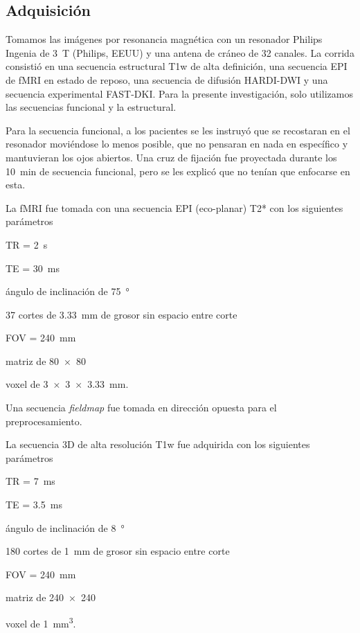 \subsection{Adquisición}
Tomamos las imágenes por resonancia magnética con un resonador Philips Ingenia de \SI{3}{\tesla} (Philips, EEUU) y una antena de cráneo de 32 canales. La corrida consistió en una secuencia estructural T1w de alta definición, una secuencia EPI de fMRI en estado de reposo, una secuencia de difusión HARDI-DWI y una secuencia experimental FAST-DKI. Para la presente investigación, solo utilizamos las secuencias funcional y la estructural.\par
Para la secuencia funcional, a los pacientes se les instruyó que se recostaran en el resonador moviéndose lo menos posible, que no pensaran en nada en específico y mantuvieran los ojos abiertos. Una cruz de fijación fue proyectada durante los \SI{10}{\minute} de secuencia funcional, pero se les explicó que no tenían que enfocarse en esta. \par
La fMRI fue tomada con una secuencia EPI (eco-planar) T2* con los siguientes parámetros
\begin{enumerate*}[label=\emph{\alph*}), before=\unskip{: }, itemjoin={{; }}, itemjoin*={{, y }}]
    \item TR = \SI{2}{\second}
    \item TE = \SI{30}{\milli\second}
    \item ángulo de inclinación de \SI{75}{\degree}
    \item 37 cortes de \SI{3.33}{\milli\meter} de grosor sin espacio entre corte
    \item FOV = \SI{240}{\milli\meter}
    \item matriz de \num{80x80}
    \item voxel de \SI[product-units=single]{3x3x3.33}{\milli\meter}.
\end{enumerate*}
Una secuencia \textit{fieldmap} fue tomada en dirección opuesta para el preprocesamiento.\par
La secuencia 3D de alta resolución T1w fue adquirida con los siguientes parámetros
\begin{enumerate*}[label=\emph{\alph*}), before=\unskip{: }, itemjoin={{; }}, itemjoin*={{, y }}]
    \item TR = \SI{7}{\milli\second}
    \item TE = \SI{3.5}{\milli\second}
    \item ángulo de inclinación de \SI{8}{\degree}
    \item 180 cortes de \SI{1}{\milli\meter} de grosor sin espacio entre corte
    \item FOV = \SI{240}{\milli\meter}
    \item matriz de \num{240x240}
    \item voxel de \SI[product-units=single]{1}{\milli\meter\cubed}.
\end{enumerate*}


